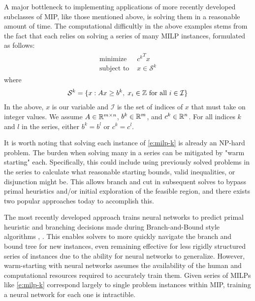 \documentclass[10pt]{article}
\begin{document}
	A major bottleneck to implementing applications of more recently developed subclasses of MIP, like those mentioned above, is solving them in a reasonable amount of time. The computational difficultly in the above examples stems from the fact that each relies on solving a series of many MILP instances, formulated as follows:
	\begin{align}
		\begin{split}
			\text{minimize } & {c^k}^T x \\
			\text{subject to } & x \in \mathcal{S}^k
		\end{split} \label{e:milp-k} \tag{MILP-$ k $}
	\end{align}
	where
	\begin{align*}
		\mathcal{S}^{k} = \{x :Ax \geq b^k, \; x_i \in \mathbb{Z} \text{ for all } i \in \mathcal{I} \}
	\end{align*}
	In the above, $ x $ is our variable and $ \mathcal{I} $ is the set of indices of $ x $ that must take on integer values. We assume $ A \in \mathbb{R}^{m \times n} $, $ b^k \in \mathbb{R}^m $, and $ c^k \in \mathbb{R}^n $. For all indices $ k $ and $ l $ in the series, either $ b^k = b^l $ or $ c^k = c^l $.
	
	It is worth noting that solving each instance of \ref{e:milp-k} is already an NP-hard problem. The burden when solving many in a series can be mitigated by "warm starting" each. Specifically, this could include using previously solved problems in the series to calculate what reasonable starting bounds, valid inequalities, or disjunction might be. This allows branch and cut in subsequent solves to bypass primal heuristics and/or initial exploration of the feasible region, and there exists two popular approaches today to accomplish this.
	
	The most recently developed approach trains neural networks to predict primal heuristic and branching decisions made during Branch-and-Bound style algorithms \cite{google}, \cite{l2b}. This enables solvers to more quickly navigate the branch and bound tree for new instances, even remaining effective for less rigidly structured series of instances due to the ability for neural networks to generalize. However, warm-starting with neural networks assumes the availability of the human and computational resources required to accurately train them. Given series of MILPs like \ref{e:milp-k} correspond largely to single problem instances within MIP, training a neural network for each one is intractible.
	
\end{document}
